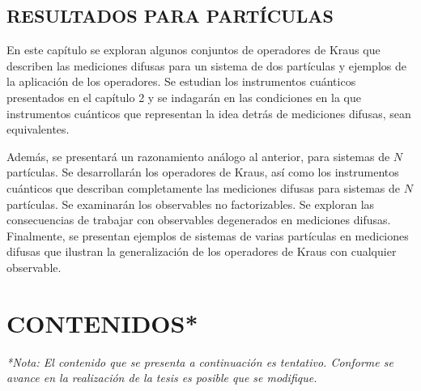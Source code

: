 \documentclass[12pt,oneside]{book}\raggedbottom{} %
\begin{document}
\begin{sloppypar}
{{%



\section{RESULTADOS PARA \texorpdfstring{}{N} PARTÍCULAS}
En este capítulo se exploran algunos conjuntos de operadores de Kraus que describen las mediciones difusas para un sistema de dos partículas y ejemplos de la aplicación de los operadores. Se estudian los instrumentos cuánticos presentados en el capítulo 2 y se indagarán en las condiciones en la que instrumentos cuánticos que representan la idea detrás de mediciones difusas, sean equivalentes. 

Además, se presentará un razonamiento análogo al anterior, para sistemas de $N$ partículas. Se  desarrollarán los operadores de Kraus, así como los instrumentos cuánticos que describan completamente las mediciones difusas para sistemas de $N$ partículas. Se examinarán los observables no factorizables. Se exploran las consecuencias de trabajar con observables degenerados en mediciones difusas.  Finalmente, se presentan ejemplos de sistemas de varias partículas en mediciones difusas que ilustran la generalización de los operadores de Kraus con cualquier observable.  

\chapter{CONTENIDOS*} %
\textit{*Nota: El contenido que se presenta a continuación es tentativo. Conforme se avance en la realización de la tesis es posible que se modifique.}


}}
\end{sloppypar}
\end{document}
